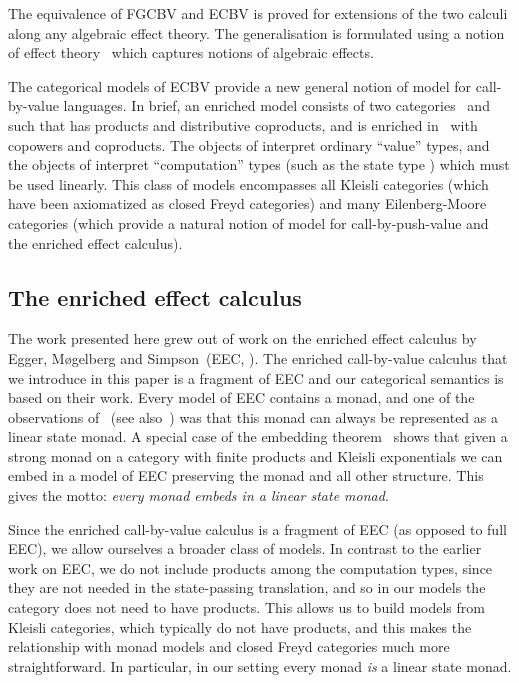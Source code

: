 \documentclass{LMCS}
\newcommand{\FGCBV}{FGCBV}
\newcommand{\ECBV}{ECBV}
\begin{document}
{The equivalence of {\FGCBV} and {\ECBV} is proved for extensions of the two calculi along any algebraic effect theory. The generalisation is formulated using a notion of effect theory~\cite{Plotkin:Pretnar:08} which captures notions of algebraic effects.

The categorical models of {\ECBV} provide a new general notion of
model for call-by-value languages. In brief, an enriched model
consists of two categories~ and  such that  has
products and distributive coproducts, and  is enriched in~
with copowers and coproducts. The objects of  interpret ordinary
``value'' types, and the objects of  interpret ``computation''
types (such as the state type ) which must be used linearly.
This class of models encompasses all Kleisli categories 
(which have been axiomatized as closed Freyd categories) and
many Eilenberg-Moore categories (which provide a natural notion of
model for call-by-push-value and the enriched effect calculus).
}

\subsection{The enriched effect calculus}
The work presented here grew out of work on the enriched effect calculus by 
Egger, M\o gelberg and Simpson~(EEC, \cite{EEC:journal,Mogelberg:CSL:09,Mogelberg:fossacs:10,EEC:LCPS:journal}). 
The enriched call-by-value calculus that we introduce in this paper is
a fragment of EEC 
and our categorical semantics is based on their work. 
Every model of EEC contains a monad, and one of the observations of~\cite{Mogelberg:fossacs:10} (see also~\cite[Example~4.2]{EEC:journal})
was that this monad can always be represented as a linear state monad.
A special case of the embedding theorem~\cite[Theorem~4]{Mogelberg:CSL:09} 
shows that given a strong monad  on a category  with finite products and 
Kleisli exponentials we can embed  in a model of EEC preserving the monad 
and all other structure. This 
gives the motto: \emph{every monad embeds in a linear state monad}.

Since the enriched call-by-value calculus is a 
fragment of EEC (as opposed to full EEC), 
we allow ourselves a broader class of
models. In contrast to the earlier work on EEC, 
we do not include products among the computation types,
since they are not needed in the state-passing translation,
and so in our models the category  does not need to 
have products. This allows us to build models from Kleisli categories,
which typically do not have products, and this makes the relationship 
with monad models and closed Freyd categories much more straightforward.
In particular, in our setting every monad \emph{is} a linear state monad.
\end{document}
